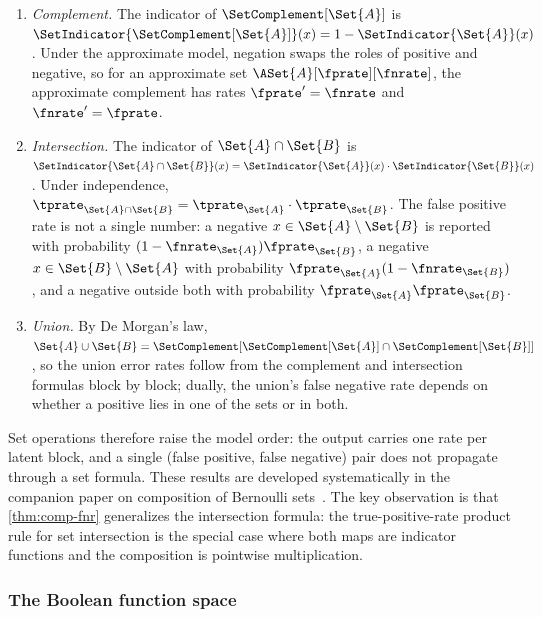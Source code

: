 \documentclass[ ../main.tex]{subfiles}
\begin{document}
\begin{enumerate}
\item \emph{Complement.}
The indicator of $\SetComplement[\Set{A}]$ is
$\SetIndicator{\SetComplement[\Set{A}]}(x) = 1 -
\SetIndicator{\Set{A}}(x)$.
Under the approximate model, negation swaps the roles of positive and
negative, so for an approximate set $\ASet{A}[\fprate][\fnrate]$, the
approximate complement has rates $\fprate' = \fnrate$ and
$\fnrate' = \fprate$.

\item \emph{Intersection.}
The indicator of $\Set{A} \cap \Set{B}$ is
$\SetIndicator{\Set{A} \cap \Set{B}}(x) =
\SetIndicator{\Set{A}}(x) \cdot \SetIndicator{\Set{B}}(x)$.
Under independence,
$\tprate_{\Set{A} \cap \Set{B}} = \tprate_{\Set{A}} \cdot
\tprate_{\Set{B}}$.
The false positive rate is not a single number: a negative
$x \in \Set{A} \setminus \Set{B}$ is reported with probability
$(1-\fnrate_{\Set{A}})\fprate_{\Set{B}}$, a negative
$x \in \Set{B} \setminus \Set{A}$ with probability
$\fprate_{\Set{A}}(1-\fnrate_{\Set{B}})$, and a negative outside both
with probability $\fprate_{\Set{A}}\fprate_{\Set{B}}$.

\item \emph{Union.}
By De Morgan's law,
$\Set{A} \cup \Set{B} =
\SetComplement[\SetComplement[\Set{A}] \cap
\SetComplement[\Set{B}]]$,
so the union error rates follow from the complement and intersection
formulas block by block; dually, the union's false negative rate depends
on whether a positive lies in one of the sets or in both.
\end{enumerate}

Set operations therefore raise the model order: the output carries one
rate per latent block, and a single (false positive, false negative) pair
does not propagate through a set formula.
These results are developed systematically in the companion paper on
composition of Bernoulli sets~\cite{bernoulliComposition}.  The key observation is that
\cref{thm:comp-fnr} generalizes the intersection formula: the
true-positive-rate product rule for set intersection is the special
case where both maps are indicator functions and the composition is
pointwise multiplication.

\subsubsection{The Boolean function space}
\end{document}
